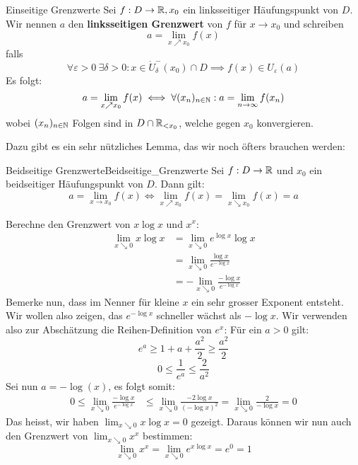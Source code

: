 \begin{definition}{Einseitige Grenzwerte}{}
Sei $f: D \to \mathbb{R}, x_0$ ein linksseitiger Häufungspunkt von $D$. Wir nennen $a$ den \textbf{linksseitigen Grenzwert} von $f$ für $x \to x_0$ und schreiben
$$a = \lim_{x \nearrow x_0}f(x)$$
falls
$$\forall \varepsilon>0 \ \exists \delta>0: x \in \dot{U}_\delta^-(x_0)\cap D \implies f(x) \in U_\varepsilon(a)$$
Es folgt:
$$a = \lim_{x \nearrow x_0} f(x) \iff \forall (x_n)_{n \in \mathbb{N}}: a = \lim_{n \to \infty}{f(x_n)}$$
wobei $(x_n)_{n \in \mathbb{N}}$ Folgen sind in $D \cap \mathbb{R}_{<x_0}$, welche gegen $x_0$ konvergieren.
\end{definition}
Dazu gibt es ein sehr nützliches Lemma, das wir noch öfters brauchen werden:
\begin{lemma}{Beidseitige Grenzwerte}{Beidseitige_Grenzwerte}
Sei $f:D \to \mathbb{R}$ und $x_0$ ein beidseitiger Häufungspunkt von $D$. Dann gilt:
$$a=\lim_{x \to x_0}{f(x)} \Longleftrightarrow \lim_{x \nearrow x_0}f(x) = \lim_{x \searrow x_0}f(x)=a$$
\end{lemma}

\begin{example}Berechne den Grenzwert von $x \log x$ und $x^x$:
\begin{align*}
\lim_{x \searrow 0} x \log x &= \lim_{x \searrow 0}e^{\log x} \log x\\
&= \lim_{x \searrow 0} \frac{\log x}{e^{- \log x}}\\
&= - \lim_{x \searrow 0} \frac{-\log x}{e^{- \log x}}
\end{align*}
Bemerke nun, dass im Nenner für kleine $x$ ein sehr grosser Exponent entsteht. Wir wollen also zeigen, das $e^{-\log x}$ schneller wächst als $-\log x$. Wir verwenden also zur Abschätzung die Reihen-Definition von $e^x$: Für ein $a>0$ gilt: $$e^a \geq 1 + a + \frac{a^2}{2} \geq \frac{a^2}{2}$$
$$0\leq \frac{1}{e^a} \leq \frac{2}{a^2}$$
Sei nun $a = -\log(x)$, es folgt somit:
\begin{align*}
    0 \leq \lim_{x \searrow 0} \frac{-\log x}{e^{- \log x}} & \leq \lim_{x \searrow 0} \frac{-2\log x}{(- \log x)^2}= \lim_{x \searrow 0} \frac{2}{- \log x} = 0
\end{align*}
Das heisst, wir haben $\lim_{x \searrow 0} x \log x = 0$ gezeigt. Daraus können wir nun auch den Grenzwert von $\lim_{x \searrow 0}x^x$ bestimmen:
$$\lim_{x \searrow 0} x^x = \lim_{x \searrow 0} e^{x \log x} = e ^0 = 1$$
\end{example}


